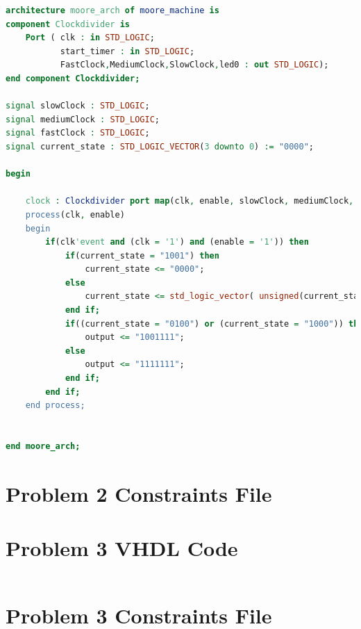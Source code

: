 \documentclass[11pt]{article}
\begin{document}
\begin{appendices}
\begin{lstlisting}[language=VHDL]
architecture moore_arch of moore_machine is
component Clockdivider is
    Port ( clk : in STD_LOGIC;
           start_timer : in STD_LOGIC;
           FastClock,MediumClock,SlowClock,led0 : out STD_LOGIC);
end component Clockdivider;

signal slowClock : STD_LOGIC;
signal mediumClock : STD_LOGIC;
signal fastClock : STD_LOGIC;
signal current_state : STD_LOGIC_VECTOR(3 downto 0) := "0000";

begin
    
    clock : Clockdivider port map(clk, enable, slowClock, mediumClock, fastClock, led0);
    process(clk, enable)
    begin
        if(clk'event and (clk = '1') and (enable = '1')) then
            if(current_state = "1001") then
                current_state <= "0000";
            else
                current_state <= std_logic_vector( unsigned(current_state) + 1 );
            end if;
            if((current_state = "0100") or (current_state = "1000")) then
                output <= "1001111";
            else
                output <= "1111111";
            end if;
        end if;
    end process;    
            

end moore_arch;

\end{lstlisting}

\section{Problem 2 Constraints File}

\section{Problem 3 VHDL Code}
\begin{lstlisting}[language=VHDL]

\end{lstlisting}

\section{Problem 3 Constraints File}

\end{appendices}
\end{document}
